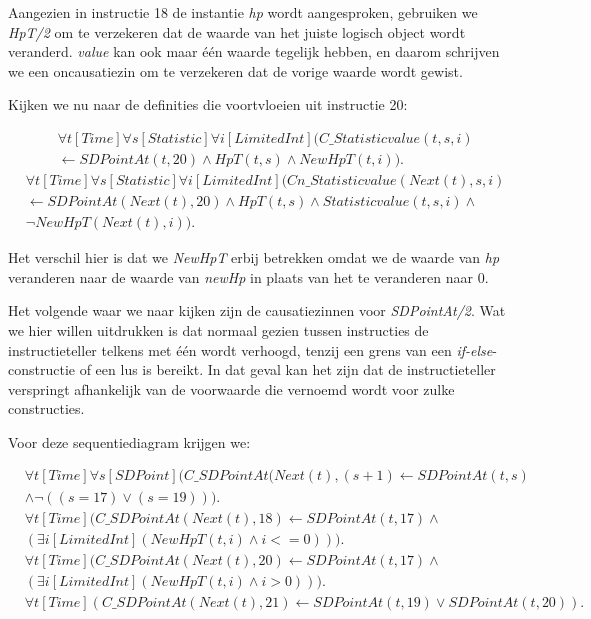 Aangezien in instructie 18 de instantie \textit{hp} wordt aangesproken, gebruiken we \textit{HpT/2} om te verzekeren dat de waarde van het juiste logisch object wordt veranderd. \textit{value} kan ook maar \'e\'en waarde tegelijk hebben, en daarom schrijven we een oncausatiezin om te verzekeren dat de vorige waarde wordt gewist.

Kijken we nu naar de definities die voortvloeien uit instructie 20:

\begin{align*}
	&\forall{t}[Time]\forall{s}[Statistic]\forall{i}[LimitedInt](C\_Statisticvalue(t, s, i) \\ &\leftarrow SDPointAt(t, 20) \land HpT(t, s) \land NewHpT(t, i)).
\end{align*}
\begin{align*}
&\forall{t}[Time]\forall{s}[Statistic]\forall{i}[LimitedInt](Cn\_Statisticvalue(Next(t), s, i) \\ &\leftarrow SDPointAt(Next(t), 20) \land HpT(t, s) \land Statisticvalue(t, s, i) \land \\ &\lnot{}NewHpT(Next(t), i)).
\end{align*}

Het verschil hier is dat we \textit{NewHpT} erbij betrekken omdat we de waarde van \textit{hp} veranderen naar de waarde van \textit{newHp} in plaats van het te veranderen naar 0.

\parbreak

Het volgende waar we naar kijken zijn de causatiezinnen voor \textit{SDPointAt/2}. Wat we hier willen uitdrukken is dat normaal gezien tussen instructies de instructieteller telkens met \'e\'en wordt verhoogd, tenzij een grens van een \textit{if-else}-constructie of een lus is bereikt. In dat geval kan het zijn dat de instructieteller verspringt afhankelijk van de voorwaarde die vernoemd wordt voor zulke constructies.

Voor deze sequentiediagram krijgen we:

\begin{align}
	&\forall{t}[Time]\forall{s}[SDPoint](C\_SDPointAt(Next(t), (s+1) \leftarrow SDPointAt(t, s) \nonumber \\ &\land \lnot{}((s = 17) \lor (s = 19))). \label{eq:sdprog} \\
	&\forall{t}[Time](C\_SDPointAt(Next(t), 18) \leftarrow SDPointAt(t, 17) \land \nonumber \\ &(\exists{i}[LimitedInt](NewHpT(t, i) \land i <= 0))). \label{eq:sdif} \\
	&\forall{t}[Time](C\_SDPointAt(Next(t), 20) \leftarrow SDPointAt(t, 17 ) \land \nonumber \\ &(\exists{i}[LimitedInt](NewHpT(t, i) \land i > 0))). \label{eq:sdthen} \\
	&\forall{t}[Time](C\_SDPointAt(Next(t), 21) \leftarrow SDPointAt(t, 19) \lor SDPointAt(t, 20)). \label{eq:sdexit}
\end{align}

